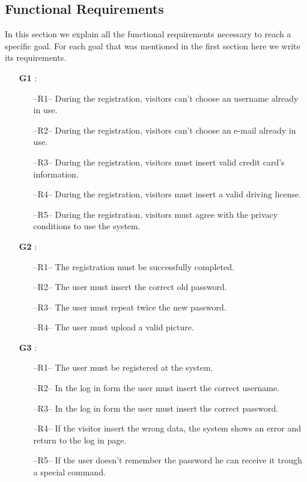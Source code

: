 \subsection{Functional Requirements} \label{sec:funct_requirements}
In this section we explain all the functional requirements necessary to reach a specific goal. For each goal that was mentioned in the first section here we write its requirements.
\begin{itemize}
\item[\textbf{G1}]: 
\begin{itemize}
\item[--R1--] During the registration, visitors can't choose an username already in use.
\item[--R2--] During the registration, visitors can't choose an e-mail already in use.
\item[--R3--] During the registration, visitors must insert valid credit card's information.
\item[--R4--] During the registration, visitors must insert a valid driving license.
\item[--R5--] During the registration, visitors must agree with the privacy conditions to use the system.
\end{itemize}

\item[\textbf{G2}]:
\begin{itemize}
\item[--R1--] The registration must be successfully completed.
\item[--R2--] The user must insert the correct old password.
\item[--R3--] The user must repeat twice the new password.
\item[--R4--] The user must upload a valid picture.
\end{itemize}

\item[\textbf{G3}]:
\begin{itemize}
\item[--R1--] The user must be registered at the system.
\item[--R2--] In the log in form the user must insert the correct username.
\item[--R3--] In the log in form the user must insert the correct password.
\item[--R4--] If the visitor insert the wrong data, the system shows an error and return to the log in page.
\item[--R5--] If the user doesn't remember the password he can receive it trough a special command.
\end{itemize}


\end{itemize}
